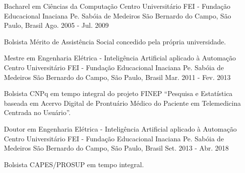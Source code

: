 

\begin{cventries}

  \cventry
    {Bacharel em Ciências da Computação} %
    {Centro Universitário FEI - Fundação Educacional Inaciana Pe. Sabóia de Medeiros} %
    {São Bernardo do Campo, São Paulo, Brasil} %
    {Ago. 2005 - Jul. 2009} %
    {
        \begin{cvitems} %
          \item {Bolsista Mérito de Assistência Social concedido pela própria universidade.}
        \end{cvitems}
    }

  \cventry
    {Mestre em Engenharia Elétrica - Inteligência Artificial aplicado à Automação}
    {Centro Universitário FEI - Fundação Educacional Inaciana Pe. Sabóia de Medeiros} %
    {São Bernardo do Campo, São Paulo, Brasil} %
    {Mar. 2011 - Fev. 2013}
    {
      \begin{cvitems} %
        \item {Bolsista CNPq em tempo integral do projeto FINEP ``Pesquisa e Estatística baseada em Acervo Digital de Prontuário Médico do Paciente em Telemedicina Centrada no Usuário''.}
      \end{cvitems}
    }

  \cventry
    {Doutor em Engenharia Elétrica - Inteligência Artificial aplicado à Automação}
    {Centro Universitário FEI - Fundação Educacional Inaciana Pe. Sabóia de Medeiros} %
    {São Bernardo do Campo, São Paulo, Brasil} %
    {Set. 2013 - Abr. 2018}
    {
      \begin{cvitems} %
        \item {Bolsista CAPES/PROSUP em tempo integral.}
      \end{cvitems}
    }

\end{cventries}
